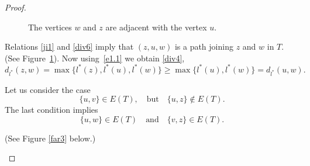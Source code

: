 \documentclass[11pt]{article}
\theoremstyle{definition}
\theoremstyle{remark}
\numberwithin{equation}{section}
\begin{document}
\begin{proof}
\begin{figure}[H]
\centering
\begin{center}


\end{center}
\caption{The vertices $w$ and $z$ are adjacent with the vertex $u$.}\label{far2}
\end{figure}







Relations \eqref{ji1} and \eqref{div6} imply that $(z,u,w)$ is a path joining $z$ and $w$ in $T$. (See Figure~\ref{far2}).
Now using~\eqref{e1.1} we obtain \eqref{div4},
\[
d_{l^*}(z, w) = \max\{ l^*(z), l^*(u), l^*(w) \}
\geq \max\{ l^*(u), l^*(w) \} = d_{l^*}(u, w).
\]

Let us consider the case
\begin{equation}
    \label{div7}
\{u,v\} \in E(T), \quad \text{but} \quad \{u,z\} \notin E(T).
\end{equation}
The last condition implies 
\begin{equation}
    \label{div8}
 \{u, w\} \in E(T) \quad \text{and} \quad \{v, z\} \in E(T).
\end{equation}


(See Figure \ref{far3} below.)






\begin{figure}[H]
\centering
\begin{center}






\end{center}
\end{figure}
\end{proof}
\end{document}
